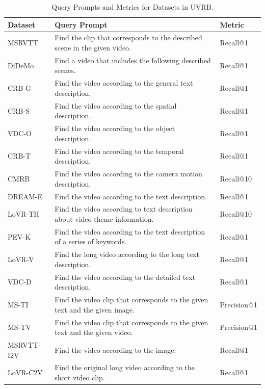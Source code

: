 \begin{table}[t]
\centering
\caption{Query Prompts and Metrics for Datasets in UVRB.}
\label{gve:tab:uvrb_prompts_metric}
\begin{tabular}{l p{9cm} l}
\toprule
\textbf{Dataset} & \textbf{Query Prompt} & \textbf{Metric} \\
\midrule
MSRVTT & Find the clip that corresponds to the described scene in the given video. & Recall@1 \\
DiDeMo & Find a video that includes the following described scenes. & Recall@1 \\
CRB-G & Find the video according to the general text description. & Recall@1 \\
CRB-S & Find the video according to the spatial description. & Recall@1 \\
VDC-O & Find the video according to the object description. & Recall@1 \\
CRB-T & Find the video according to the temporal description. & Recall@1 \\
CMRB & Find the video according to the camera motion description. & Recall@10 \\
DREAM-E & Find the video according to the text description. & Recall@1 \\
LoVR-TH & Find the video according to text description about video theme information. & Recall@10 \\
PEV-K & Find the video according to the text description of a series of keywords. & Recall@1 \\
LoVR-V & Find the long video according to the long text description. & Recall@1 \\
VDC-D & Find the video according to the detailed text description. & Recall@1 \\
MS-TI & Find the video clip that corresponds to the given text and the given image. & Precision@1 \\
MS-TV & Find the video clip that corresponds to the given text and the given video. & Precision@1 \\
MSRVTT-I2V & Find the video according to the image. & Recall@1 \\
LoVR-C2V & Find the original long video according to the short video clip. & Recall@1 \\
\bottomrule
\end{tabular}
\end{table}




